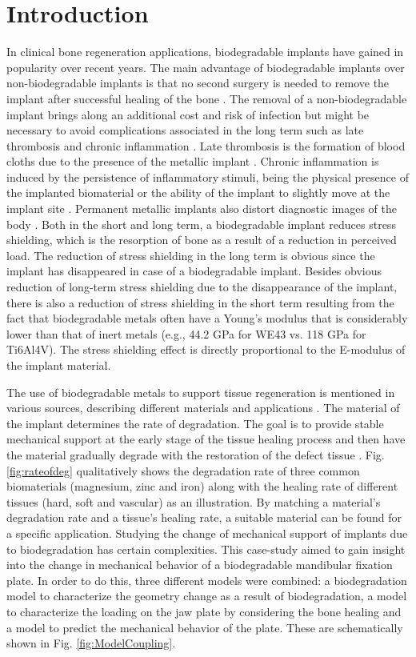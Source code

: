 \section{Introduction}

In clinical bone regeneration applications, biodegradable implants have gained in popularity over recent years. The main advantage of biodegradable implants over non-biodegradable implants is that no second surgery is needed to remove the implant after successful healing of the bone \cite{Zheng2014}. The removal of a non-biodegradable implant brings along an additional cost and risk of infection but might be necessary to avoid complications associated in the long term such as late thrombosis and chronic inflammation \cite{KChen}. Late thrombosis is the formation of blood cloths due to the presence of the metallic implant \cite{thrombosis}. Chronic inflammation is induced by the persistence of inflammatory stimuli, being the physical presence of the implanted biomaterial or the ability of the implant to slightly move at the implant site \cite{inflammation}. Permanent metallic implants also distort diagnostic images of the body \cite{Han}. Both in the short and long term, a biodegradable implant reduces stress shielding, which is the resorption of bone as a result of a reduction in perceived load. The reduction of stress shielding in the long term is obvious since the implant has disappeared in case of a biodegradable implant. Besides obvious reduction of long-term stress shielding due to the disappearance of the implant, there is also a reduction of stress shielding in the short term resulting from the fact that biodegradable metals often have a Young's modulus that is considerably lower than that of inert metals (e.g., 44.2 GPa for WE43 vs. 118 GPa for Ti6Al4V). The stress shielding effect is directly proportional to the E-modulus of the implant material.

The use of biodegradable metals to support tissue regeneration is mentioned in various sources, describing different materials and applications \cite{KChen,JChen,Yang}. The material of the implant determines the rate of degradation. The goal is to provide stable mechanical support at the early stage of the tissue healing process and then have the material gradually degrade with the restoration of the defect tissue \cite{Yang}. Fig. \ref{fig:rateofdeg} qualitatively shows the degradation rate of three common biomaterials (magnesium, zinc and iron) along with the healing rate of different tissues (hard, soft and vascular) as an illustration. By matching a material's degradation rate and a tissue's healing rate, a suitable material can be found for a specific application. Studying the change of mechanical support of implants due to biodegradation has certain complexities. This case-study aimed to gain insight into the change in mechanical behavior of a biodegradable mandibular fixation plate. In order to do this, three different models were combined: a biodegradation model to characterize the geometry change as a result of biodegradation, a model to characterize the loading on the jaw plate by considering the bone healing and a model to predict the mechanical behavior of the plate. These are schematically shown in Fig. \ref{fig:ModelCoupling}.

